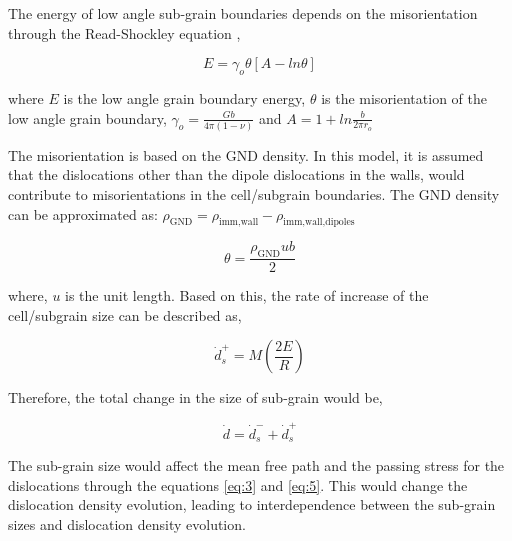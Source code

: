 \documentclass[a4paper,11pt]{article}
\begin{document}
The energy of low angle sub-grain boundaries depends on the misorientation through the Read-Shockley equation \cite{Read1950}, 

\begin{equation}
E = \gamma_o \theta [A - ln \theta] \label{eq:22}
\end{equation}

where \begin{math} E \end{math} is the low angle grain boundary energy, \begin{math} \theta \end{math} is the misorientation of the low angle grain boundary,
\begin{math} \gamma_o = \frac{Gb}{4\pi \left( 1 - \nu \right)} \end{math} and \begin{math} A = 1 + ln \frac{b}{2 \pi r_o} \end{math}

The misorientation is based on the GND density. 
In this model, it is assumed that the dislocations other than the dipole dislocations in the walls, would contribute to misorientations in the cell/subgrain boundaries. 
The GND density  can be approximated as: 
\begin{math} \rho_{\text{GND}} = \rho_{\text{imm,wall}} - \rho_{\text{imm,wall,dipoles}} \end{math}

\begin{equation}
\theta = \frac{\rho_{\text{GND}} ub}{2}  \label{eq:23}
\end{equation}

where, \begin{math} u \end{math} is the unit length. 
Based on this, the rate of increase of the cell/subgrain size can be described as,

\begin{equation}
{\dot{d}}_s^+ = M\left(\frac{2E}{R}\right)  \label{eq:24}
\end{equation}

Therefore, the total change in the size of sub-grain would be,

\begin{equation}
{\dot{d}} = {\dot{d}}_s^- + {\dot{d}}_s^+  \label{eq:24}
\end{equation}

The sub-grain size would affect the mean free path and the passing stress for the dislocations through the equations \eqref{eq:3} and \eqref{eq:5}. 
This would change the dislocation density evolution, leading to interdependence between the sub-grain sizes and dislocation density evolution.




\end{document}
